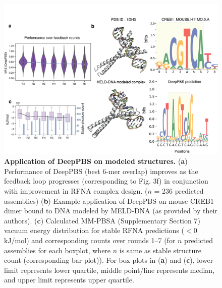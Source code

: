 \begin{center}
\begin{figure}[H]
  \includegraphics[width=\linewidth]{./pdnafigs/figS9.png}
    \caption[Application of DeepPBS on modeled structures.]{\textbf{Application of DeepPBS on modeled structures.} ({\bf a}) Performance of DeepPBS (best 6-mer overlap) improves as
the feedback loop progresses (corresponding to Fig. 3f) in conjunction with improvement in RFNA complex design. ($n$ = 236 predicted assemblies) ({\bf b}) Example application of DeepPBS on mouse CREB1 dimer bound to DNA modeled
by MELD-DNA (as provided by their authors). ({\bf c}) Calculated MM-PBSA (Supplementary Section 7) vacuum energy
distribution for stable RFNA predictions ($<$0 kJ/mol) and corresponding counts over rounds 1–7 (for $n$ predicted
assemblies for each boxplot, where $n$ is same as stable structure count (corresponding bar plot)). For box plots in ({\bf a})
and ({\bf c}), lower limit represents lower quartile, middle point/line represents median, and upper limit represents upper
quartile.}
  \label{fig:pdnaS9}
\end{figure}
\end{center}


